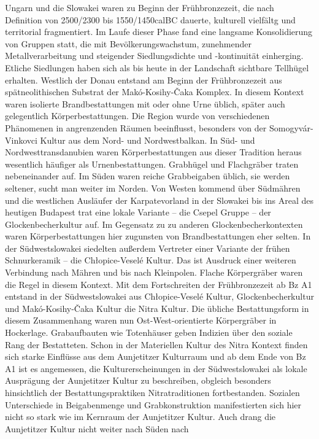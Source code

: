 \documentclass[openany,twoside,twocolumn]{book}
\begin{document}
Ungarn und die Slowakei waren zu Beginn der Frühbronzezeit, die nach
Definition von 2500/2300 bis 1550/1450calBC dauerte, kulturell vielfältg
und territorial fragmentiert. Im Laufe dieser Phase fand eine langsame
Konsolidierung von Gruppen statt, die mit Bevölkerungswachstum,
zunehmender Metallverarbeitung und steigender Siedlungsdichte und
-kontinuität einherging. Etliche Siedlungen haben sich als bis heute in
der Landschaft sichtbare Tellhügel erhalten. Westlich der Donau entstand
am Beginn der Frühbronzezeit aus spätneolithischen Substrat der
Makó-Kosihy-Čaka Komplex. In diesem Kontext waren isolierte
Brandbestattungen mit oder ohne Urne üblich, später auch gelegentlich
Körperbestattungen. Die Region wurde von verschiedenen Phänomenen in
angrenzenden Räumen beeinflusst, besonders von der Somogyvár-Vinkovci
Kultur aus dem Nord- und Nordwestbalkan. In Süd- und
Nordwesttransdanubien waren Körperbestattungen aus dieser Tradition
heraus wesentlich häufiger als Urnenbestattungen. Grabhügel und
Flachgräber traten nebeneinander auf. Im Süden waren reiche Grabbeigaben
üblich, sie werden seltener, sucht man weiter im Norden. Von Westen
kommend über Südmähren und die westlichen Ausläufer der Karpatevorland
in der Slowakei bis ins Areal des heutigen Budapest trat eine lokale
Variante -- die Csepel Gruppe -- der Glockenbecherkultur auf. Im
Gegensatz zu zu anderen Glockenbecherkontexten waren Körperbestattungen
hier zugunsten von Brandbestattungen eher selten. In der Südwestslowakei
siedelten außerdem Vertreter einer Variante der frühen Schnurkeramik --
die Chłopice-Veselé Kultur. Das ist Ausdruck einer weiteren Verbindung
nach Mähren und bis nach Kleinpolen. Flache Körpergräber waren die Regel
in diesem Kontext. Mit dem Fortschreiten der Frühbronzezeit ab Bz A1
entstand in der Südwestslowakei aus Chłopice-Veselé Kultur,
Glockenbecherkultur und Makó-Kosihy-Čaka Kultur die Nitra Kultur. Die
übliche Bestattungsform in diesem Zusammenhang waren nun
Ost-West-orientierte Körpergräber in Hockerlage. Grabaufbauten wie
Totenhäuser geben Indizien über den soziale Rang der Bestatteten. Schon
in der Materiellen Kultur des Nitra Kontext finden sich starke Einflüsse
aus dem Aunjetitzer Kulturraum und ab dem Ende von Bz A1 ist es
angemessen, die Kulturerscheinungen in der Südwestslowakei als lokale
Ausprägung der Aunjetitzer Kultur zu beschreiben, obgleich besonders
hinsichtlich der Bestattungspraktiken Nitratraditionen fortbestanden.
Sozialen Unterschiede in Beigabenmenge und Grabkonstruktion
manifestierten sich hier nicht so stark wie im Kernraum der Aunjetitzer
Kultur. Auch drang die Aunjetitzer Kultur nicht weiter nach Süden nach
\end{document}
